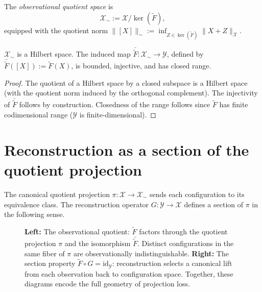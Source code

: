 \documentclass[12pt, oneside]{memoir}
\newcommand{\X}{\mathcal{X}}
\newcommand{\Ft}{\widetilde{F}}
\newcommand{\nnorm}[1]{\lVert #1 \rVert}
\begin{document}
\begin{definition}
\label{def:quotient}
The \emph{observational quotient space} is
\[
  \X_\sim := \X / \ker(\Ft),
\]
equipped with the quotient norm $\nnorm{[X]}_\sim := \inf_{Z \in \ker(\Ft)} \nnorm{X+Z}_\X$.
\end{definition}

\begin{proposition}[Hilbert structure on $\X_\sim$]
\label{prop:quotient-hilbert}
$\X_\sim$ is a Hilbert space.  The induced map $\bar\Ft: \X_\sim \to \mathcal{Y}$,
defined by $\bar\Ft([X]) := \Ft(X)$, is bounded, injective, and has closed range.
\end{proposition}

\begin{proof}
The quotient of a Hilbert space by a closed subspace is a Hilbert space (with the
quotient norm induced by the orthogonal complement).  The injectivity of $\bar\Ft$
follows by construction.  Closedness of the range follows since $\Ft$ has finite
codimensional range ($\mathcal{Y}$ is finite-dimensional).
\end{proof}

\section{Reconstruction as a section of the quotient projection}

The canonical quotient projection $\pi: \X \to \X_\sim$ sends each configuration to its
equivalence class.  The reconstruction operator $G: \mathcal{Y} \to \X$ defines a
section of $\pi$ in the following sense.

\begin{figure}[htbp]
\centering
{}
\qquad\qquad
{}
\caption{\textbf{Left:} The observational quotient: $\Ft$ factors through the
quotient projection $\pi$ and the isomorphism $\bar\Ft$.  Distinct configurations
in the same fiber of $\pi$ are observationally indistinguishable.
\textbf{Right:} The section property $\Ft \circ G = \mathrm{id}_{\mathcal{Y}}$:
reconstruction selects a canonical lift from each observation back to configuration
space.  Together, these diagrams encode the full geometry of projection loss.}
\label{fig:quotient-section}
\end{figure}
\end{document}
